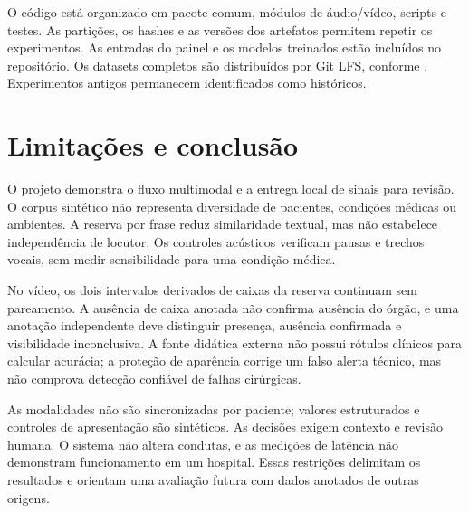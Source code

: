 \documentclass[12pt,a4paper]{article}
\begin{document}
\ResultadoRecursos

O código está organizado em pacote comum, módulos de áudio/vídeo, scripts e testes. As partições, os hashes e as versões dos artefatos permitem repetir os experimentos. As entradas do painel e os modelos treinados estão incluídos no repositório. Os datasets completos são distribuídos por Git LFS, conforme . Experimentos antigos permanecem identificados como históricos.

\ComandosReproducao

\section{Limitações e conclusão}
O projeto demonstra o fluxo multimodal e a entrega local de sinais para revisão. O corpus sintético não representa diversidade de pacientes, condições médicas ou ambientes. A reserva por frase reduz similaridade textual, mas não estabelece independência de locutor. Os controles acústicos verificam pausas e trechos vocais, sem medir sensibilidade para uma condição médica.

No vídeo, os dois intervalos derivados de caixas da reserva continuam sem pareamento. A ausência de caixa anotada não confirma ausência do órgão, e uma anotação independente deve distinguir presença, ausência confirmada e visibilidade inconclusiva. A fonte didática externa não possui rótulos clínicos para calcular acurácia; a proteção de aparência corrige um falso alerta técnico, mas não comprova detecção confiável de falhas cirúrgicas.

As modalidades não são sincronizadas por paciente; valores estruturados e controles de apresentação são sintéticos. As decisões exigem contexto e revisão humana. O sistema não altera condutas, e as medições de latência não demonstram funcionamento em um hospital. Essas restrições delimitam os resultados e orientam uma avaliação futura com dados anotados de outras origens.

\clearpage
\end{document}
